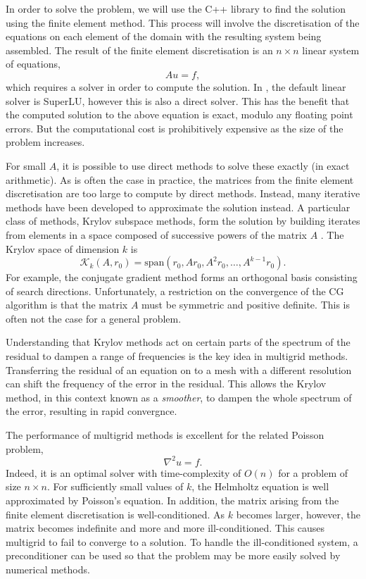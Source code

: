 In order to solve the problem, we will use the C++ library \oomph to find the solution using the finite element method.
This process will involve the discretisation of the equations on each element of the domain with the resulting system being assembled.
The result of the finite element discretisation is an $n\times n$ linear system of equations,
\[
	A u = f,
\]
which requires a solver in order to compute the solution.
In \oomph, the default linear solver is SuperLU, however this is also a direct solver.
This has the benefit that the computed solution to the above equation is exact, modulo any floating point errors.
But the computational cost is prohibitively expensive as the size of the problem increases.

For small $A$, it is possible to use direct methods to solve these exactly (in exact arithmetic).
As is often the case in practice, the matrices from the finite element discretisation are too large to compute by direct methods.
Instead, many iterative methods have been developed to approximate the solution instead.
A particular class of methods, Krylov subspace methods, form the solution by building iterates from elements in a space composed of successive powers of the matrix $A$ \cite{leveque}.
The Krylov space of dimension $k$ is 
\[
	\mathcal{K}_k(A, r_0) = \mathrm{span}(r_0, Ar_0, A^2 r_0, \ldots, A^{k-1} r_0).
\]
For example, the conjugate gradient method forms an orthogonal basis consisting of search directions.
Unfortunately, a restriction on the convergence of the CG algorithm is that the matrix $A$ must be symmetric and positive definite.
This is often not the case for a general problem.

Understanding that Krylov methods act on certain parts of the spectrum of the residual to dampen a range of frequencies is the key idea in multigrid methods.
Transferring the residual of an equation on to a mesh with a different resolution can shift the frequency of the error in the residual.
This allows the Krylov method, in this context known as a \textit{smoother}, to dampen the whole spectrum of the error, resulting in rapid convergnce.

The performance of multigrid methods is excellent for the related Poisson problem,
\begin{equation}
	\nabla^2 u = f.
\end{equation}
Indeed, it is an optimal solver with time-complexity of $O(n)$ for a problem of size $n\times n$.
For sufficiently small values of $k$, the Helmholtz equation is well approximated by Poisson's equation.
In addition, the matrix arising from the finite element discretisation is well-conditioned.
As $k$ becomes larger, however, the matrix becomes indefinite and more and more ill-conditioned.
This causes multigrid to fail to converge to a solution.
To handle the ill-conditioned system, a preconditioner can be used so that the problem may be more easily solved by numerical methods.

